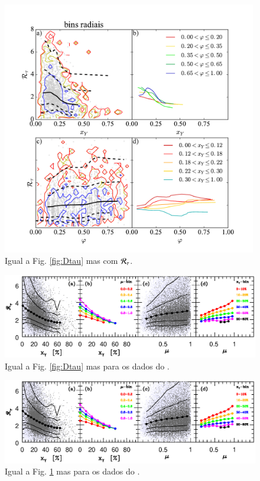 \begin{figure}
	\centering
	\includegraphics[width=0.99\textwidth]{figuras/RtauR.pdf}
	\caption[$\Rtau$, $x_Y$ e $\varphi$.]
	{Igual a Fig. \ref{fig:Dtau} mas com $\Rtau$.}
	\label{fig:Rtau}
\end{figure}

\begin{figure}
	\centering
	\includegraphics[bb= 30 370 550 550, width=\textwidth]{figuras/P12fig4.eps}
	\caption[$\Rtau$, $x_Y$ e $\varphi$.]
	{Igual a Fig. \ref{fig:Dtau} mas para os dados do \SDSS.}
	\label{fig:DtauSDSS}
\end{figure}

\begin{figure}
	\centering
	\includegraphics[bb= 30 370 550 550, width=\textwidth]{figuras/P12fig4.eps}
	\caption[$\Rtau$, $x_Y$ e $\varphi$.]
	{Igual a Fig. \ref{fig:Rtau} mas para os dados do \SDSS.}
	\label{fig:RtauSDSS}
\end{figure}

